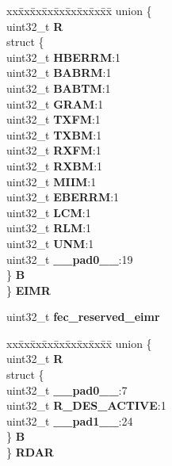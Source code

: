 \begin{DoxyCompactItemize}
\begin{tabbing}
\end{tabbing}\item 
\mbox{\label{structFEC__tag_aa45bdb3cbe8a3c3703f5c80dc0a7dc53}} 
\begin{tabbing}
xx\=xx\=xx\=xx\=xx\=xx\=xx\=xx\=xx\=\kill
union \{\\
\>uint32\_t {\bfseries R}\\
\>struct \{\\
\>\>uint32\_t {\bfseries HBERRM}:1\\
\>\>uint32\_t {\bfseries BABRM}:1\\
\>\>uint32\_t {\bfseries BABTM}:1\\
\>\>uint32\_t {\bfseries GRAM}:1\\
\>\>uint32\_t {\bfseries TXFM}:1\\
\>\>uint32\_t {\bfseries TXBM}:1\\
\>\>uint32\_t {\bfseries RXFM}:1\\
\>\>uint32\_t {\bfseries RXBM}:1\\
\>\>uint32\_t {\bfseries MIIM}:1\\
\>\>uint32\_t {\bfseries EBERRM}:1\\
\>\>uint32\_t {\bfseries LCM}:1\\
\>\>uint32\_t {\bfseries RLM}:1\\
\>\>uint32\_t {\bfseries UNM}:1\\
\>\>uint32\_t {\bfseries \_\_pad0\_\_}:19\\
\>\} {\bfseries B}\\
\} {\bfseries EIMR}\\

\end{tabbing}\item 
\mbox{\label{structFEC__tag_a13fea48f75c8615d57227e74e3b9a50b}} 
uint32\+\_\+t {\bfseries fec\+\_\+reserved\+\_\+eimr}
\item 
\mbox{\label{structFEC__tag_a821b90368241b04d0cb2b606e6cffc84}} 
\begin{tabbing}
xx\=xx\=xx\=xx\=xx\=xx\=xx\=xx\=xx\=\kill
union \{\\
\>uint32\_t {\bfseries R}\\
\>struct \{\\
\>\>uint32\_t {\bfseries \_\_pad0\_\_}:7\\
\>\>uint32\_t {\bfseries R\_DES\_ACTIVE}:1\\
\>\>uint32\_t {\bfseries \_\_pad1\_\_}:24\\
\>\} {\bfseries B}\\
\} {\bfseries RDAR}\\


\end{tabbing}
\end{DoxyCompactItemize}
